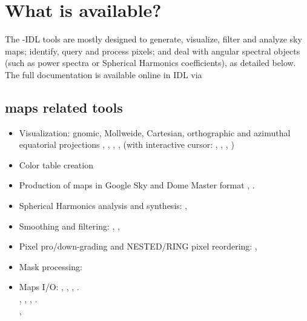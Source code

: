 \section{What is available?}



The \healpixns-IDL tools are mostly designed to 
generate, visualize, filter and analyze sky maps;
identify, query and process \healpix pixels; 
and deal with angular spectral objects (such as power spectra or Spherical
Harmonics coefficients), 
as detailed below.
The full documentation is available online in IDL via 
\subsection[Maps related tools]{\healpix maps related tools}
\begin{itemize} 
%
\item Visualization: gnomic, Mollweide, Cartesian,
orthographic and azimuthal equatorial projections
, 
, 
, 
, 
(with interactive cursor:
,
,
,
)
%
\item Color table creation 
%
\item Production of \healpix maps in Google Sky and Dome Master format
,
.
% 
\item Spherical Harmonics analysis and synthesis:
,
%
\item Smoothing and filtering:
,
,
%
\item Pixel pro/down-grading and NESTED/RING pixel reordering:
,
%
\item Mask processing:
%
\item Maps I/O:
,
,
,
.\\
,
, 
,
. \\
,
\end{itemize}
